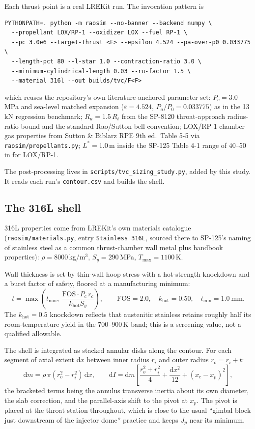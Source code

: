 \documentclass[11pt]{article}
\newcommand{\cmd}[1]{\nolinkurl{#1}}
\newcommand{\Rt}{R_t}
\begin{document}
Each thrust point is a real LREKit run. The invocation pattern is

\begin{lstlisting}
PYTHONPATH=. python -m raosim --no-banner --backend numpy \
  --propellant LOX/RP-1 --oxidizer LOX --fuel RP-1 \
  --pc 3.0e6 --target-thrust <F> --epsilon 4.524 --pa-over-p0 0.033775 \
  --length-pct 80 --l-star 1.0 --contraction-ratio 3.0 \
  --minimum-cylindrical-length 0.03 --ru-factor 1.5 \
  --material 316l --out builds/tvc/F<F>
\end{lstlisting}

which reuses the repository's own literature-anchored parameter set:
$P_c = 3.0$\,MPa and sea-level matched expansion ($\varepsilon = 4.524$,
$P_a/P_0 = 0.033775$) as in the 13\,kN regression benchmark;
$R_u = 1.5\,\Rt$ from the SP-8120 throat-approach radius-ratio bound and the
standard Rao/Sutton bell convention; LOX/RP-1 chamber gas properties from
Sutton \& Biblarz RPE 9th ed.\ Table 5-5 via
\cmd{raosim/propellants.py}; $L^* = 1.0$\,m inside the SP-125 Table 4-1
range of 40--50\,in for LOX/RP-1.

The post-processing lives in \cmd{scripts/tvc\_sizing\_study.py}, added by
this study. It reads each run's \cmd{contour.csv} and builds the shell.

\subsection{The 316L shell}

316L properties come from LREKit's own materials catalogue
(\cmd{raosim/materials.py}, entry \texttt{Stainless 316L}, sourced there to
SP-125's naming of stainless steel as a common thrust-chamber wall metal
plus handbook properties): $\rho = 8000$\,kg/m$^3$, $S_y = 290$\,MPa,
$T_{\max} = 1100$\,K.

Wall thickness is set by thin-wall hoop stress with a hot-strength knockdown
and a burst factor of safety, floored at a manufacturing minimum:
\begin{equation}
t = \max\!\left(t_{\min},\ \frac{\mathrm{FOS}\cdot P_c\,r_c}{k_{\text{hot}} S_y}\right),
\qquad \mathrm{FOS}=2.0,\quad k_{\text{hot}}=0.50,\quad t_{\min}=1.0\ \text{mm}.
\end{equation}
The $k_{\text{hot}}=0.5$ knockdown reflects that austenitic stainless retains
roughly half its room-temperature yield in the 700--900\,K band; this is a
screening value, not a qualified allowable.

The shell is integrated as stacked annular disks along the contour. For each
segment of axial extent $\mathrm{d}x$ between inner radius $r_i$ and outer
radius $r_o = r_i + t$:
\begin{equation}
\mathrm{d}m = \rho\,\pi (r_o^2 - r_i^2)\,\mathrm{d}x, \qquad
\mathrm{d}I = \mathrm{d}m\!\left[\frac{r_o^2+r_i^2}{4} + \frac{\mathrm{d}x^2}{12}
+ (x_c - x_p)^2\right],
\end{equation}
the bracketed terms being the annulus transverse inertia about its own
diameter, the slab correction, and the parallel-axis shift to the pivot at
$x_p$. The pivot is placed at the throat station throughout, which is close
to the usual ``gimbal block just downstream of the injector dome'' practice
and keeps $J_p$ near its minimum.
\end{document}
